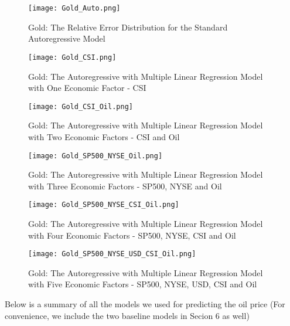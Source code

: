 \documentclass[runningheads]{llncs}
\begin{document}
\begin{figure}
\centering
\texttt{[image: Gold\_Auto.png]}
\caption{Gold: The Relative Error Distribution for the Standard Autoregressive Model}
\label{fig:Gold_Auto.png}
\end{figure}

\begin{figure}
\centering
\texttt{[image: Gold\_CSI.png]}
\caption{Gold: The Autoregressive with Multiple Linear Regression Model with One Economic Factor - CSI}
\label{fig:Gold_CSI.png}
\end{figure}

\begin{figure}
\centering
\texttt{[image: Gold\_CSI\_Oil.png]}
\caption{Gold: The Autoregressive with Multiple Linear Regression Model with Two Economic Factors - CSI and Oil}
\label{fig:Gold_CSI_Oil.png}
\end{figure}

\begin{figure}
\centering
\texttt{[image: Gold\_SP500\_NYSE\_Oil.png]}
\caption{Gold: The Autoregressive with Multiple Linear Regression Model with Three Economic Factors - SP500, NYSE and Oil}
\label{fig:Gold_SP500_NYSE_Oil.png}
\end{figure}

\begin{figure}
\centering
\texttt{[image: Gold\_SP500\_NYSE\_CSI\_Oil.png]}
\caption{Gold: The Autoregressive with Multiple Linear Regression Model with Four Economic Factors - SP500, NYSE, CSI and Oil}
\label{fig:Gold_SP500_NYSE_CSI_Oil.png}
\end{figure}

\begin{figure}
\centering
\texttt{[image: Gold\_SP500\_NYSE\_USD\_CSI\_Oil.png]}
\caption{Gold: The Autoregressive with Multiple Linear Regression Model with Five Economic Factors - SP500, NYSE, USD, CSI and Oil}
\label{fig:Gold_SP500_NYSE_USD_CSI_Oil.png}
\end{figure}

\noindent Below is a summary of all the models we used for predicting the oil price (For convenience, we include the two baseline models in Secion 6 as well) \\
\end{document}
